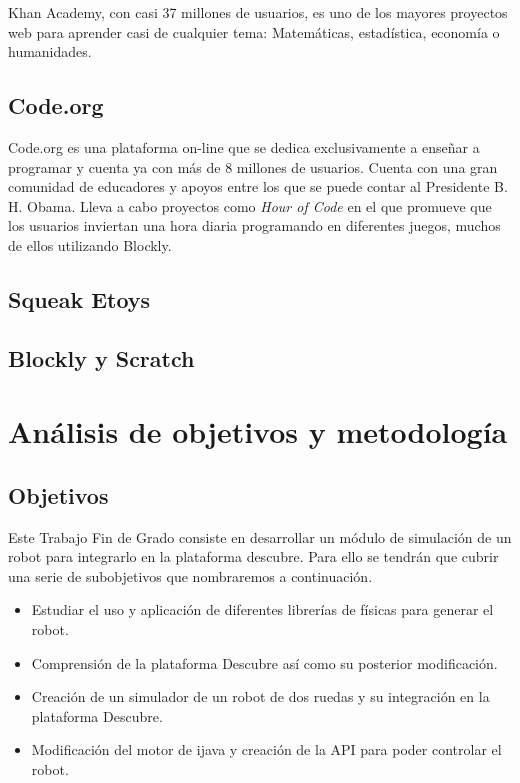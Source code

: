 Khan Academy\cite{khan-academy}, con casi 37 millones de usuarios, es uno de los mayores proyectos web para aprender casi de cualquier tema: Matemáticas, estadística, economía o humanidades.


\section{Code.org}
\label{sec:Code.org}

Code.org\cite{code-org} es una plataforma on-line que se dedica exclusivamente a enseñar a programar y cuenta ya con más de 8 millones de usuarios. Cuenta con una gran comunidad de educadores y apoyos entre los que se puede contar al Presidente B. H. Obama. Lleva a cabo proyectos como \emph{Hour of Code} en el que promueve que los usuarios inviertan una hora diaria programando en diferentes juegos, muchos de ellos utilizando \Gls{Blockly}\cite{blockly}.


\section{Squeak Etoys}
\label{sec:squeak-etoys}


\section{Blockly y Scratch}
\label{sec:blockly-scratch}


\chapter{Análisis de objetivos y metodología}\label{objetivos-metodologia}

\section{Objetivos}
\label{sec:Objetivos}

Este Trabajo Fin de Grado consiste en desarrollar un módulo de simulación de un robot para integrarlo en la plataforma \Gls{descubre}. Para ello se tendrán que cubrir una serie de subobjetivos que nombraremos a continuación.
\begin{itemize}
\item Estudiar el uso y aplicación de diferentes librerías de físicas para generar el robot.
\item Comprensión de la plataforma Descubre así como su posterior modificación.
\item Creación de un simulador de un robot de dos ruedas y su integración en la plataforma Descubre.
\item Modificación del motor de \gls{ijava} y creación de la \acrshort{API} para poder controlar el robot.
\end{itemize}

